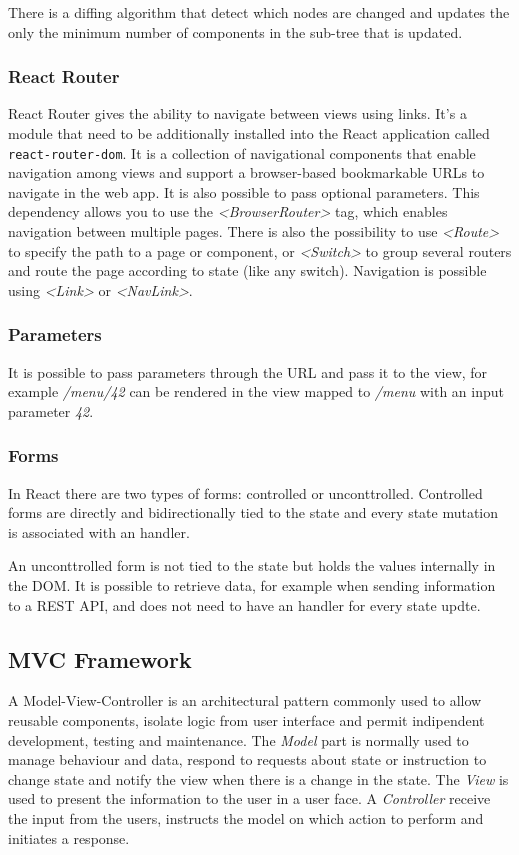 There is a diffing algorithm that detect which nodes are changed and updates the only the minimum number of components in the sub-tree that is updated.

\subsubsection*{React Router}
React Router gives the ability to navigate between views using links. It's a module that need to be additionally installed into the React application called \texttt{react-router-dom}. It is a collection of navigational components that enable navigation among views and support a browser-based bookmarkable URLs to navigate in the web app. It is also possible to pass optional parameters.
This dependency allows you to use the \textit{<BrowserRouter>} tag, which enables navigation between multiple pages.
There is also the possibility to use \textit{<Route>} to specify the path to a page or component, or \textit{<Switch>} to group several routers and route the page according to state (like any switch).
Navigation is possible using \textit{<Link>} or \textit{<NavLink>}.

\subsubsection*{Parameters}
It is possible to pass parameters through the URL and pass it to the view, for example \textit{/menu/42} can be rendered in the view mapped to \textit{/menu} with an input parameter \textit{42}.

\subsubsection*{Forms}
In React there are two types of forms: controlled or unconttrolled.
Controlled forms are directly and bidirectionally tied to the state and every state mutation is associated with an handler.

An unconttrolled form is not tied to the state but holds the values internally in the DOM. It is possible to retrieve data, for example when sending information to a REST API, and does not need to have an handler for every state updte.


\subsection*{MVC Framework}
A Model-View-Controller is an architectural pattern commonly used to allow reusable components, isolate logic from user interface and permit indipendent development, testing and maintenance. 
The \textit{Model} part is normally used to manage behaviour and data, respond to requests about state or instruction to change state and notify the view when there is a change in the state.
The \textit{View} is used to present the information to the user in a user face.
A \textit{Controller} receive the input from the users, instructs the model on which action to perform and initiates a response.

